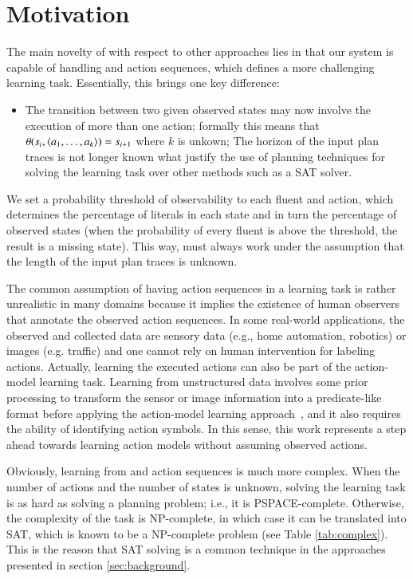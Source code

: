 
\section{Motivation}
\label{sec:motivation}

The main novelty of \FAMA with respect to other approaches lies in that our system is capable of handling \PO and \NO action sequences, which defines a more challenging learning task. Essentially, this brings one key difference:
\begin{itemize}
\item The transition between two given observed states may now involve the execution of more than one action; formally this means that $\theta(s_i,{\langle a_1,\ldots,a_k \rangle})=s_{i+1}$ where $k$ is unkown; The horizon of the input plan traces is not longer known what justify the use of planning techniques for solving the learning task over other methods such as a SAT solver. 
\end{itemize}
  
We set a probability threshold of observability to each fluent and action, which determines the percentage of literals in each state and in turn the percentage of observed states (when the probability of every fluent is above the threshold, the result is a missing state). This way, \FAMA must always work under the assumption that the length of the input plan traces is unknown.

The common assumption of having \FO action sequences in a learning task is rather unrealistic in many domains because it implies the existence of human observers that annotate the observed action sequences. In some real-world applications, the observed and collected data are sensory data (e.g., home automation, robotics) or images (e.g. traffic) and one cannot rely on human intervention for labeling actions. Actually, learning the executed actions can also be part of the action-model learning task. Learning from unstructured data involves some prior processing to transform the sensor or image information into a predicate-like format before applying the action-model learning approach~\cite{AsaiF18}, and it also requires the ability of identifying action symbols. In this sense, this work represents a step ahead towards learning action models without assuming observed actions.

Obviously, learning from \PO and \NO action sequences is much more complex. When the number of actions and the number of states is unknown, solving the learning task is as hard as solving a \strips\texttt{} planning problem; i.e., it is PSPACE-complete. Otherwise, the complexity of the task is NP-complete, in which case it can be translated into SAT, which is known to be a NP-complete problem (see Table \ref{tab:complex}). This is the reason that SAT solving is a common technique in the approaches presented in section \ref{sec:background}.


